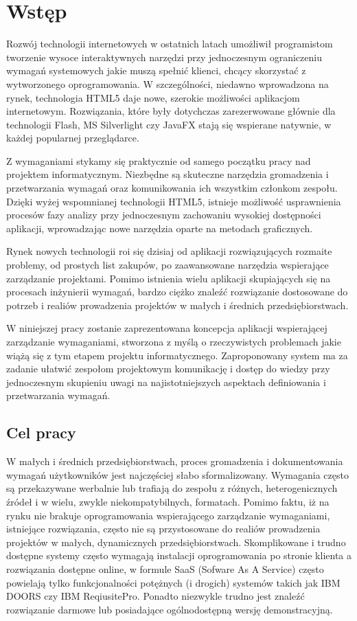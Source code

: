 \chapter{Wstęp}

    Rozwój technologii internetowych w ostatnich latach umożliwił programistom tworzenie wysoce interaktywnych narzędzi przy jednoczesnym ograniczeniu wymagań systemowych jakie muszą spełnić klienci, chcący skorzystać z wytworzonego oprogramowania. W szczególności, niedawno wprowadzona na rynek, technologia HTML5 daje nowe, szerokie możliwości aplikacjom internetowym. Rozwiązania, które były dotychczas zarezerwowane głównie dla technologii Flash, MS Silverlight czy JavaFX stają się wspierane natywnie, w każdej popularnej przeglądarce. 

    Z wymaganiami stykamy się praktycznie od samego początku pracy nad projektem informatycznym. Niezbędne są skuteczne narzędzia gromadzenia i przetwarzania wymagań oraz komunikowania ich wszystkim członkom zespołu. Dzięki wyżej wspomnianej technologii HTML5, istnieje możliwość usprawnienia procesów fazy analizy przy jednoczesnym zachowaniu wysokiej dostępności aplikacji, wprowadzając nowe narzędzia oparte na metodach graficznych. 

    Rynek nowych technologii roi się dzisiaj od aplikacji rozwiązujących rozmaite problemy, od prostych list zakupów, po zaawansowane narzędzia wspierające zarządzanie projektami. Pomimo istnienia wielu aplikacji skupiających się na procesach inżynierii wymagań, bardzo ciężko znaleźć rozwiązanie dostosowane do potrzeb i realiów prowadzenia projektów w małych i średnich przedsiębiorstwach. 
          
    W niniejszej pracy zostanie zaprezentowana koncepcja aplikacji wspierającej zarządzanie wymaganiami, stworzona z myślą o rzeczywistych problemach jakie wiążą się z tym etapem projektu informatycznego. Zaproponowany system ma za zadanie ułatwić zespołom projektowym komunikację i dostęp do wiedzy przy jednoczesnym skupieniu uwagi na najistotniejszych aspektach definiowania i przetwarzania wymagań.


    \section{Cel pracy}

      W małych i średnich przedsiębiorstwach, proces gromadzenia i dokumentowania wymagań użytkowników jest najczęściej słabo sformalizowany. Wymagania często są przekazywane werbalnie lub trafiają do zespołu z różnych, heterogenicznych źródeł i w wielu, zwykle niekompatybilnych, formatach. Pomimo faktu, iż na rynku nie brakuje oprogramowania wspierającego zarządzanie wymaganiami, istniejące rozwiązania, często nie są przystosowane do realiów prowadzenia projektów w małych, dynamicznych przedsiębiorstwach. Skomplikowane i trudno dostępne systemy często wymagają instalacji oprogramowania po stronie klienta a rozwiązania dostępne online, w formule SaaS (Sofware As A Service) często powielają tylko funkcjonalności potężnych (i drogich) systemów takich jak IBM DOORS czy IBM ReqiusitePro. Ponadto niezwykle trudno jest znaleźć rozwiązanie darmowe lub posiadające ogólnodostępną wersję demonstracyjną. 

